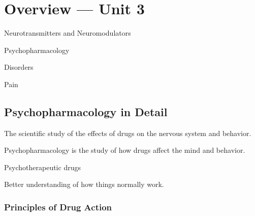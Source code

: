 
\section{Overview — Unit 3}

\begin{coloredlist}
    \item Neurotransmitters and Neuromodulators
    \begin{coloredlist}
        \item Psychopharmacology
        \item Disorders
        \item Pain
    \end{coloredlist}
\end{coloredlist}

\subsection{Psychopharmacology in Detail}

\begin{coloredlist}
    \item The scientific study of the effects of drugs on the nervous system and behavior.
    \item Psychopharmacology is the study of how drugs affect the mind and behavior.
    \begin{coloredlist}
        \item Psychotherapeutic drugs
        \item Better understanding of how things normally work.
    \end{coloredlist}
\end{coloredlist}

\subsubsection{Principles of Drug Action}

